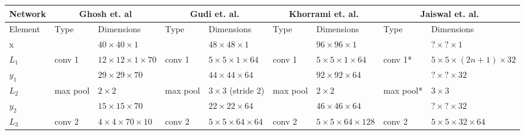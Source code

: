\documentclass[11pt,twoside]{report}
\begin{document}
\begin{table}[h!]
\centering
{\footnotesize
\begin{tabular}{|lllllllll|}
\hline
Network                      & \multicolumn{2}{c}{Ghosh et. al\cite{Ghosh2015}}                         & \multicolumn{2}{c}{Gudi et. al.\cite{Gudi2015}}                            & \multicolumn{2}{c}{Khorrami et. al.\cite{dodeeplearn}}                          & \multicolumn{2}{c|}{Jaiswal et. al.\cite{Jaiswal2016}}   \\ \hline
\multicolumn{1}{|l|}{Element} & Type     & \multicolumn{1}{l|}{Dimensions}                    & Type     & \multicolumn{1}{l|}{Dimensions}                      & Type          & \multicolumn{1}{l|}{Dimensions}                  & Type      & Dimensions                     \\ \hline
\multicolumn{1}{|l|}{x}       &          & \multicolumn{1}{l|}{$40\times40\times1$}           &          & \multicolumn{1}{l|}{$48\times 48\times1$}            &               & \multicolumn{1}{l|}{$96\times96\times1$}         &           & $?\times?\times1$              \\ \hline
\multicolumn{1}{|l|}{$L_1$}   & conv 1   & \multicolumn{1}{l|}{$12\times 12\times1\times 70$} & conv 1   & \multicolumn{1}{l|}{$5\times 5\times1\times64$}      & conv 1        & \multicolumn{1}{l|}{$5\times5\times1\times64$}   & conv 1*   & $5\times5\times(2n+1)\times32$ \\
\multicolumn{1}{|l|}{$y_1$}   &          & \multicolumn{1}{l|}{$29\times29\times70$}          &          & \multicolumn{1}{l|}{$44\times44\times64$}            &               & \multicolumn{1}{l|}{$92\times92\times64$}        &           & $?\times?\times32$             \\ \hline
\multicolumn{1}{|l|}{$L_2$}   & max pool & \multicolumn{1}{l|}{$2\times 2$}                   & max pool & \multicolumn{1}{l|}{$3\times3$ (stride 2)}           & max pool      & \multicolumn{1}{l|}{$2\times2$}                  & max pool*  & $3\times3$                    \\
\multicolumn{1}{|l|}{$y_2$}   &          & \multicolumn{1}{l|}{$15\times15\times 70$}         &          & \multicolumn{1}{l|}{$22\times 22\times64$}           &               & \multicolumn{1}{l|}{$46\times46\times64$}        &           & $?\times?\times32$             \\ \hline
\multicolumn{1}{|l|}{$L_3$}   & conv 2   & \multicolumn{1}{l|}{$4\times 4\times70\times 10$}  & conv 2   & \multicolumn{1}{l|}{$5 \times 5 \times 64\times64$}  & conv 2        & \multicolumn{1}{l|}{$5\times5\times64\times128$} & conv 2    & $5\times5\times32\times64$     \\

\end{tabular}}
\end{table}
\end{document}
